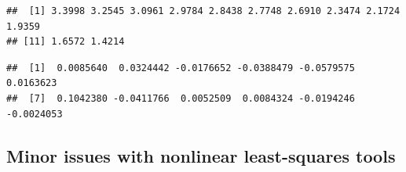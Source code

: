 \documentclass[
]{article}
\newenvironment{Shaded}{\begin{snugshade}}{\end{snugshade}}
\newcommand{\AttributeTok}[1]{\textcolor[rgb]{0.13,0.29,0.53}{#1}}
\newcommand{\CommentTok}[1]{\textcolor[rgb]{0.56,0.35,0.01}{\textit{#1}}}
\newcommand{\ConstantTok}[1]{\textcolor[rgb]{0.56,0.35,0.01}{#1}}
\newcommand{\DecValTok}[1]{\textcolor[rgb]{0.00,0.00,0.81}{#1}}
\newcommand{\FunctionTok}[1]{\textcolor[rgb]{0.13,0.29,0.53}{\textbf{#1}}}
\newcommand{\NormalTok}[1]{#1}
\newcommand{\OtherTok}[1]{\textcolor[rgb]{0.56,0.35,0.01}{#1}}
\newcommand{\SpecialCharTok}[1]{\textcolor[rgb]{0.81,0.36,0.00}{\textbf{#1}}}
\newcommand{\StringTok}[1]{\textcolor[rgb]{0.31,0.60,0.02}{#1}}
\begin{document}
\begin{Shaded}
\end{Shaded}

\begin{verbatim}
##  [1] 3.3998 3.2545 3.0961 2.9784 2.8438 2.7748 2.6910 2.3474 2.1724 1.9359
## [11] 1.6572 1.4214
\end{verbatim}

\begin{Shaded}
\end{Shaded}

\begin{verbatim}
##  [1]  0.0085640  0.0324442 -0.0176652 -0.0388479 -0.0579575  0.0163623
##  [7]  0.1042380 -0.0411766  0.0052509  0.0084324 -0.0194246 -0.0024053
\end{verbatim}

\hypertarget{minor-issues-with-nonlinear-least-squares-tools}{%
\subsection{Minor issues with nonlinear least-squares
tools}\label{minor-issues-with-nonlinear-least-squares-tools}}
\end{document}
